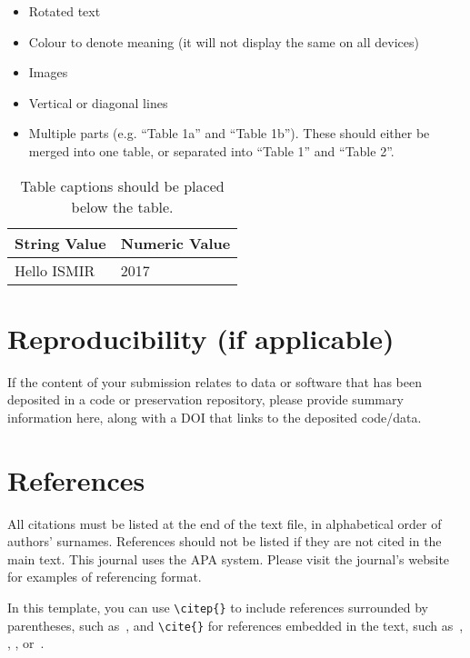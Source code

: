 \documentclass{article}
\begin{document}
\begin{itemize}
  \item Rotated text
  \item Colour to denote meaning (it will not display the same on all devices)
  \item Images
  \item Vertical or diagonal lines
  \item Multiple parts (e.g. ``Table 1a'' and ``Table 1b'').
  These should either be merged into one table,
  or separated into ``Table 1'' and ``Table 2''.
\end{itemize}

\begin{table}[htpb]
\centering
  \begin{tabular}{ll}
  \toprule
  \bfseries String Value & \bfseries Numeric Value \\ \midrule
  Hello ISMIR  & 2017          \\
  \bottomrule
  \end{tabular}
  \caption{Table captions should be placed below the table.}
\label{tab:table}
\end{table}


\section{Reproducibility (if applicable)}

If the content of your submission relates to data or software
that has been deposited in a code or preservation repository,
please provide summary information here, along with a DOI that
links to the deposited code/data.



\section{References}

All citations must be listed at the end of the text file,
in alphabetical order of authors' surnames.
References should not be listed if they are not cited in
the main text.
This journal uses the APA system.
Please visit the journal's website
for examples of referencing format.

In this template, you can use \verb=\citep{}= to include references
surrounded by parentheses, such as~\citep{KneesS16_MusicSimilarityRetrieval_SPRINGER}, and \verb=\cite{}=
for references embedded in the text,
such as~\cite{WeihsJVR16_MusicDataAnalysis_CRC},
\cite{SerraEtAl13_RoadmapMIR_CreativeCommon},
\cite{Lerch15_AudioContentAnalysis_WILEY},
or~\cite{Mueller15_FMP_SPRINGER}.
\end{document}
